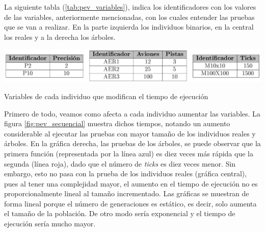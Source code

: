		La siguiente tabla (\ref{tab:pev_variables}), indica los identificadores con los valores de las variables, anteriormente mencionadas, con los cuales entender las pruebas que se van a realizar. En la parte izquierda los individuos binarios, en la central los reales y a la derecha los árboles.
		
		\begin{table}[!h]
			\centering
			\includegraphics[width=1\textwidth]{images/chapter_4/tab_pev_variables}		
			\caption{Variables de cada individuo que modifican el tiempo de ejecución}
			\label{tab:pev_variables}
		\end{table}		
	
			
		Primero de todo, veamos como afecta a cada individuo aumentar las variables. La figura \ref{fig:pev_secuencial} muestra dichos tiempos, notando un aumento considerable al ejecutar las pruebas con mayor tamaño de los individuos reales y árboles. En la gráfica derecha, las pruebas de los árboles, se puede observar que la primera función (representada por la línea azul) es diez veces más rápida que la segunda (línea roja), dado que el número de \textit{ticks} es diez veces menor. Sin embargo, esto no pasa con la prueba de los individuos reales (gráfica central), pues al tener una complejidad mayor, el aumento en el tiempo de ejecución no es proporcionalmente lineal al tamaño incrementado. Las gráficas se muestran de forma lineal porque el número de generaciones es estático, es decir, solo aumenta el tamaño de la población. De otro modo sería exponencial y el tiempo de ejecución sería mucho mayor.
	

	
	
